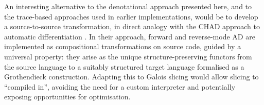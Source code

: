 
An interesting alternative to the denotational approach presented here, and to the trace-based approaches used
in earlier \GPS implementations, would be to develop a source-to-source transformation, in direct analogy with
the CHAD approach to automatic differentiation \cite{vakar22,nunes2023}. In their approach, forward and
reverse-mode AD are implemented as compositional transformations on source code, guided by a universal
property: they arise as the unique structure-preserving functors from the source language to a suitably
structured target language formalised as a Grothendieck construction. Adapting this to Galois slicing would
allow slicing to ``compiled in'', avoiding the need for a custom interpreter and potentially exposing
opportunities for optimisation.
